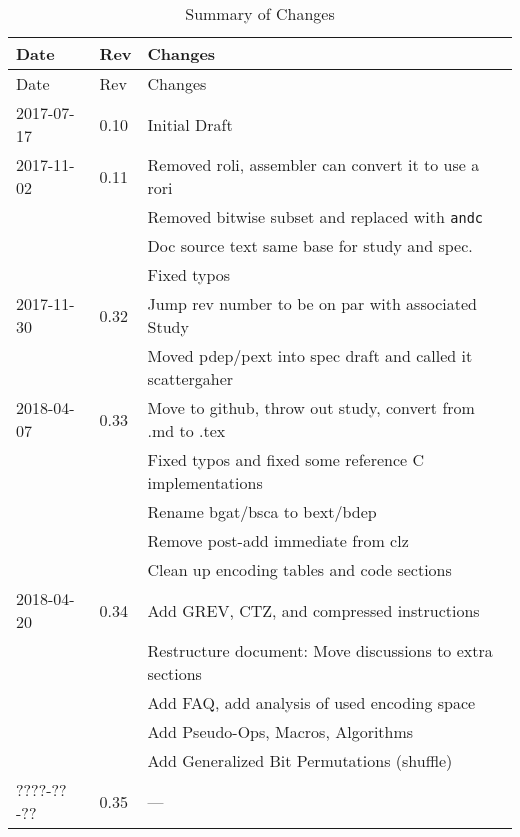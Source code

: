 \documentclass[twoside,11pt]{book}
\begin{document}
\begin{longtable}[c]{@{}lll@{}}
\caption{Summary of Changes}\tabularnewline
\toprule
Date & Rev & Changes\tabularnewline
\midrule
\endfirsthead
\toprule
Date & Rev & Changes\tabularnewline
\midrule
\endhead
2017-07-17 & 0.10 & Initial Draft\tabularnewline
2017-11-02 & 0.11 & Removed roli, assembler can convert it to use a rori\tabularnewline
           &      & Removed bitwise subset and replaced with \texttt{andc}\tabularnewline
           &      & Doc source text same base for study and spec.\tabularnewline
           &      & Fixed typos\tabularnewline
2017-11-30 & 0.32 & Jump rev number to be on par with associated Study\tabularnewline
           &      & Moved pdep/pext into spec draft and called it scattergaher\tabularnewline
2018-04-07 & 0.33 & Move to github, throw out study, convert from .md to .tex\tabularnewline
           &      & Fixed typos and fixed some reference C implementations\tabularnewline
           &      & Rename bgat/bsca to bext/bdep\tabularnewline
           &      & Remove post-add immediate from clz\tabularnewline
           &      & Clean up encoding tables and code sections\tabularnewline
2018-04-20 & 0.34 & Add GREV, CTZ, and compressed instructions\tabularnewline
           &      & Restructure document: Move discussions to extra sections\tabularnewline
           &      & Add FAQ, add analysis of used encoding space\tabularnewline
           &      & Add Pseudo-Ops, Macros, Algorithms\tabularnewline
           &      & Add Generalized Bit Permutations (shuffle)\tabularnewline
????-??-?? & 0.35 & ---\tabularnewline
\bottomrule
\end{longtable}

% 
% 
\end{document}
